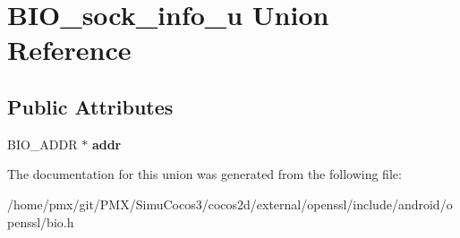 \hypertarget{unionBIO__sock__info__u}{}\section{B\+I\+O\+\_\+sock\+\_\+info\+\_\+u Union Reference}
\label{unionBIO__sock__info__u}
\subsection*{Public Attributes}
\begin{DoxyCompactItemize}
\item 
\mbox{\label{unionBIO__sock__info__u_ab540a16c168a5c96852cbeb69fbe376f}} 
B\+I\+O\+\_\+\+A\+D\+DR $\ast$ {\bfseries addr}
\end{DoxyCompactItemize}


The documentation for this union was generated from the following file\+:\begin{DoxyCompactItemize}
\item 
/home/pmx/git/\+P\+M\+X/\+Simu\+Cocos3/cocos2d/external/openssl/include/android/openssl/bio.\+h\end{DoxyCompactItemize}
